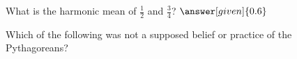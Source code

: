 \documentclass{ximera}
\begin{document}
\begin{question}
What is the harmonic mean of $\frac12$ and $\frac34$? $\answer[given]{0.6}$
\end{question}

\begin{question}
Which of the following was not a supposed belief or practice of the Pythagoreans?
\begin{multipleChoice}
\end{multipleChoice}
\end{question}


\end{document}
